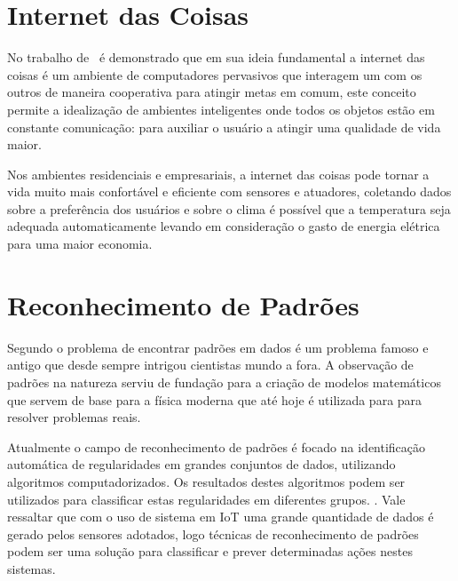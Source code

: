


\section{Internet das Coisas}

No trabalho de~ é demonstrado que em sua ideia fundamental a internet das coisas é um ambiente de computadores pervasivos que interagem um com os outros de maneira cooperativa para atingir metas em comum, este conceito permite a idealização de ambientes inteligentes onde todos os objetos estão em constante comunicação: para auxiliar o usuário a atingir uma qualidade de vida maior.

Nos ambientes residenciais e empresariais, a internet das coisas pode tornar a vida muito mais confortável e eficiente com sensores e atuadores, coletando dados sobre a preferência dos usuários e sobre o clima é possível que a temperatura seja adequada automaticamente levando em consideração o gasto de energia elétrica para uma maior economia.


\section{Reconhecimento de Padrões}

Segundo  o problema de encontrar padrões em dados é um problema famoso e antigo que desde sempre intrigou cientistas mundo a fora. A observação de padrões na natureza serviu de fundação para a criação de modelos matemáticos que servem de base para a física moderna que até hoje é utilizada para para resolver problemas reais. 

Atualmente o campo de reconhecimento de padrões é focado na identificação automática de regularidades em grandes conjuntos de dados, utilizando algoritmos computadorizados. Os resultados destes algoritmos podem ser utilizados para classificar estas regularidades em diferentes grupos. \cite{bishop:2006}. Vale ressaltar que com o uso de sistema em IoT uma grande quantidade de dados é gerado pelos sensores adotados, logo técnicas de reconhecimento de padrões podem ser uma solução para classificar e prever determinadas ações nestes sistemas.

